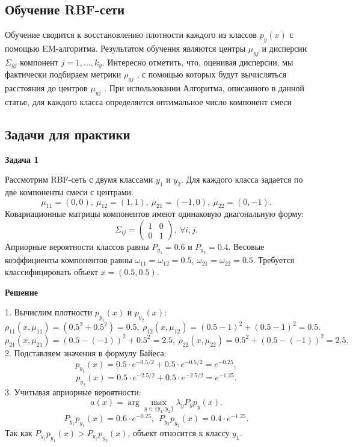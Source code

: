 \subsection*{Обучение RBF-сети}

Обучение сводится к восстановлению плотности каждого из классов $p_y(x)$ с помощью EM-алгоритма. Результатом обучения являются центры $\mu _{yj}$ и дисперсии $\Sigma _{yj}$ компонент $j = 1, . . . , k_y$. Интересно отметить, что, оценивая дисперсии, мы фактически подбираем метрики $\rho _{yj}$ , с помощью которых будут вычисляться расстояния до центров $\mu _{yj}$ . При использовании Алгоритма, описанного в данной статье, для каждого класса определяется оптимальное число компонент смеси


\subsection*{Задачи для практики}

\textbf{Задача 1}

Рассмотрим RBF-сеть с двумя классами $ y_1 $ и $ y_2 $. Для каждого класса задается по две компоненты смеси с центрами:
\[
\mu_{11} = (0, 0), \ \mu_{12} = (1, 1), \ \mu_{21} = (-1, 0), \ \mu_{22} = (0, -1).
\]
Ковариационные матрицы компонентов имеют одинаковую диагональную форму:
\[
\Sigma_{ij} = \begin{pmatrix} 1 & 0 \\
0 & 1 \end{pmatrix}, \ \forall i, j.
\]
Априорные вероятности классов равны $ P_{y_1} = 0.6 $ и $ P_{y_2} = 0.4 $. Весовые коэффициенты компонентов равны $ \omega_{11} = \omega_{12} = 0.5 $, $ \omega_{21} = \omega_{22} = 0.5 $. Требуется классифицировать объект $ x = (0.5, 0.5) $.

\textbf{Решение}

1. Вычислим плотности $ p_{y_1}(x) $ и $ p_{y_2}(x) $:
\[
\rho_{11}(x, \mu_{11}) = (0.5^2 + 0.5^2) = 0.5, \ \rho_{12}(x, \mu_{12}) = (0.5 - 1)^2 + (0.5 - 1)^2 = 0.5.
\]
\[
\rho_{21}(x, \mu_{21}) = (0.5 - (-1))^2 + 0.5^2 = 2.5, \ \rho_{22}(x, \mu_{22}) = 0.5^2 + (0.5 - (-1))^2 = 2.5.
\]
2. Подставляем значения в формулу Байеса:
\[
p_{y_1}(x) = 0.5 \cdot e^{-0.5/2} + 0.5 \cdot e^{-0.5/2} = e^{-0.25},
\]
\[
p_{y_2}(x) = 0.5 \cdot e^{-2.5/2} + 0.5 \cdot e^{-2.5/2} = e^{-1.25}.
\]
3. Учитывая априорные вероятности:
\[
a(x) = \arg\max_{y \in \{y_1, y_2\}} \lambda_y P_y p_y(x).
\]
\[
P_{y_1} p_{y_1}(x) = 0.6 \cdot e^{-0.25}, \ \ P_{y_2} p_{y_2}(x) = 0.4 \cdot e^{-1.25}.
\]
Так как $ P_{y_1} p_{y_1}(x) > P_{y_2} p_{y_2}(x) $, объект относится к классу $ y_1 $.

